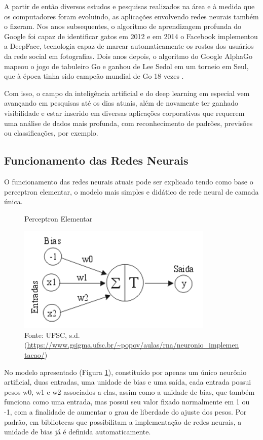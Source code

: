 \par A partir de então diversos estudos e pesquisas realizados na área e à medida que os computadores foram evoluindo, as aplicações envolvendo redes neurais também o fizeram. Nos anos subsequentes, o algoritmo de aprendizagem profunda do Google foi capaz de identificar gatos em 2012 e em 2014 o Facebook implementou a DeepFace, tecnologia capaz de marcar automaticamente os rostos dos usuários da rede social em fotografias. Dois anos depois, o algoritmo do Google AlphaGo mapeou o jogo de tabuleiro Go e ganhou de Lee Sedol em um torneio em Seul, que à época tinha sido campeão mundial de Go 18 vezes \cite{Academy2019}.

\par Com isso, o campo da inteligência artificial e do deep learning em especial vem avançando em pesquisas até os dias atuais, além de novamente ter ganhado visibilidade e estar inserido em diversas aplicações corporativas que requerem uma análise de dados mais profunda, com reconhecimento de padrões, previsões ou classificações, por exemplo.

\subsection{Funcionamento das Redes Neurais}

\indent
\par O funcionamento das redes neurais atuais pode ser explicado tendo como base o perceptron elementar, o modelo mais simples e didático de rede neural de camada única.

\begin{figure}[H]
    \centering
    \caption{Perceptron Elementar}
    \includegraphics[width=0.6\linewidth]{Imagens/perceptron.png}
    \caption*{Fonte: UFSC, s.d. (\url{https://www.gsigma.ufsc.br/~popov/aulas/rna/neuronio_implementacao/})}
    \label{perceptron}
\end{figure}

\par No modelo apresentado (Figura \ref{perceptron}), constituído por apenas um único neurônio artificial, duas entradas, uma unidade de bias e uma saída, cada entrada possui pesos w0, w1 e w2 associados a elas, assim como a unidade de bias, que também funciona como uma entrada, mas possui seu valor fixado normalmente em 1 ou -1, com a finalidade de aumentar o grau de liberdade do ajuste dos pesos. Por padrão, em bibliotecas que possibilitam a implementação de redes neurais, a unidade de bias já é definida automaticamente.

